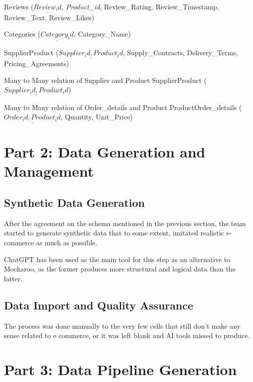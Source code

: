 \documentclass[
]{article}
\begin{document}
Reviews (\(\underline{Review_id}\), \emph{Product\_id}, Review\_Rating,
Review\_Timestamp, Review\_Text, Review\_Likes)

Categories (\(\underline{Category_id}\), Category\_Name)

SupplierProduct (\(\underline{Supplier_id, Product_id}\),
Supply\_Contracts, Delivery\_Terms, Pricing\_Agreements)

Many to Many relation of Supplier and Product SupplierProduct
(\(\underline{Supplier_id,Product_id}\))

Many to Many relation of Order\_details and Product
ProductOrder\_details (\(\underline{Order_id, Product_id}\), Quantity,
Unit\_Price)

\hypertarget{part-2-data-generation-and-management}{%
\section{Part 2: Data Generation and
Management}\label{part-2-data-generation-and-management}}

\hypertarget{synthetic-data-generation}{%
\subsection{Synthetic Data Generation}\label{synthetic-data-generation}}

After the agreement on the schema mentioned in the previous section, the
team started to generate synthetic data that to some extent, imitated
realistic e-commerce as much as possible.

ChatGPT has been used as the main tool for this step as an alternative
to Mockaroo, as the former produces more structural and logical data
than the latter.

\hypertarget{data-import-and-quality-assurance}{%
\subsection{Data Import and Quality
Assurance}\label{data-import-and-quality-assurance}}

The process was done manually to the very few cells that still don't
make any sense related to e commerce, or it was left blank and AI tools
missed to produce.

\hypertarget{part-3-data-pipeline-generation}{%
\section{Part 3: Data Pipeline
Generation}\label{part-3-data-pipeline-generation}}
\end{document}
